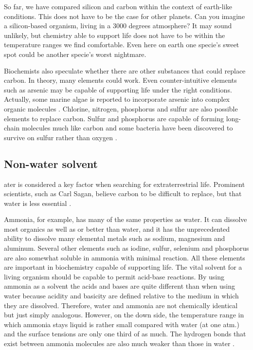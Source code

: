 So far, we have compared silicon and carbon within the context of earth-like conditions.
This does not have to be the case for other planets.
Can you imagine a silicon-based organism, living in a 3000 degrees atmosphere?
It may sound unlikely, but chemistry able to support life does not have to be within the temperature ranges we find comfortable.
Even here on earth one specie's sweet spot could be another specie's worst nightmare.

Biochemists also speculate whether there are other substances that could replace carbon.
In theory, many elements could work.
Even counter-intuitive elements such as arsenic may be capable of supporting life under the right conditions.
Actually, some marine algae is reported to incorporate arsenic into complex organic molecules \cite{OForm3}.
Chlorine, nitrogen, phosphorus and sulfur are also possible elements to replace carbon.
Sulfur and phosphorus are capable of forming long-chain molecules much like carbon and some bacteria have been discovered to survive on sulfur rather than oxygen \cite{OForm3}.

\subsection{Non-water solvent}

ater is considered a key factor when searching for extraterrestrial life.
Prominent scientists, such as Carl Sagan, believe carbon to be difficult to replace, but that water is less essential \cite{OForm2} \cite{OForm3}.

Ammonia, for example, has many of the same properties as water.
It can dissolve most organics as well as or better than water, and it has the unprecedented ability to dissolve many elemental metals such as sodium, magnesium and aluminum.
Several other elements such as iodine, sulfur, selenium and phosphorus are also somewhat soluble in ammonia with minimal reaction.
All these elements are important in biochemistry capable of supporting life.
The vital solvent for a living organism should be capable to permit acid-base reactions.
By using ammonia as a solvent the acids and bases are quite different than when using water because acidity and basicity are defined relative to the medium in which they are dissolved. Therefore, water and ammonia are not chemically identical but just simply analogous.
However, on the down side, the temperature range in which ammonia stays liquid is rather small compared with water (at one atm.) and the surface tensions are only one third of as much.
The hydrogen bonds that exist between ammonia molecules are also much weaker than those in water \cite{OForm7}.


